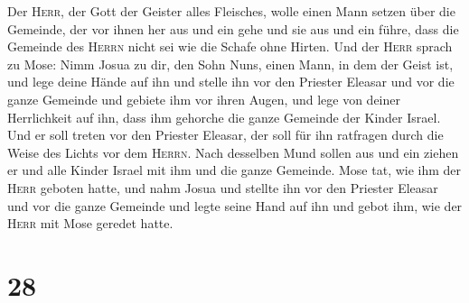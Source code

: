  Der \textsc{Herr}, der Gott der Geister alles Fleisches,
wolle einen Mann setzen über die Gemeinde,  der vor ihnen
her aus und ein gehe und sie aus und ein führe, dass die Gemeinde des
\textsc{Herrn} nicht sei wie die Schafe ohne Hirten.  Und
der \textsc{Herr} sprach zu Mose: Nimm Josua zu dir, den Sohn Nuns,
einen Mann, in dem der Geist ist, und lege deine Hände auf ihn
 und stelle ihn vor den Priester Eleasar und vor die
ganze Gemeinde und gebiete ihm vor ihren Augen,  und lege
von deiner Herrlichkeit auf ihn, dass ihm gehorche die ganze Gemeinde
der Kinder Israel.  Und er soll treten vor den Priester
Eleasar, der soll für ihn ratfragen durch die Weise des Lichts vor dem
\textsc{Herrn}. Nach desselben Mund sollen aus und ein ziehen er und
alle Kinder Israel mit ihm und die ganze Gemeinde.  Mose
tat, wie ihm der \textsc{Herr} geboten hatte, und nahm Josua und stellte
ihn vor den Priester Eleasar und vor die ganze Gemeinde 
und legte seine Hand auf ihn und gebot ihm, wie der \textsc{Herr} mit
Mose geredet hatte.

\hypertarget{section-27}{%
\section{28}\label{section-27}}

